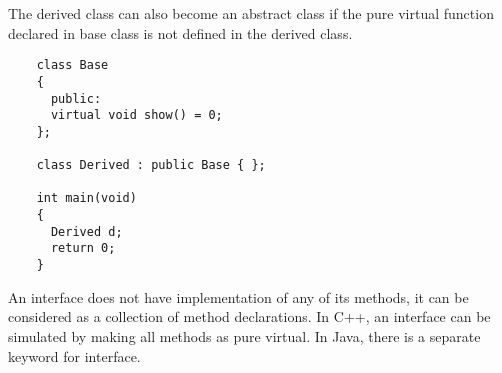 \documentclass[11pt,fleqn]{book} %
\begin{document}
The derived class can also become an abstract class if the pure virtual function declared in base class is not defined in the derived class.
\begin{example}
  \begin{lstlisting}
    class Base
    {
      public:
      virtual void show() = 0;
    };

    class Derived : public Base { };

    int main(void)
    {
      Derived d;
      return 0;
    }
  \end{lstlisting}
\end{example}
\begin{corollary}
  An interface does not have implementation of any of its methods, it can be considered as a collection of method declarations. In C++, an interface can be simulated by making all methods as pure virtual. In Java, there is a separate keyword for interface.
\end{corollary}

\newpage
\end{document}
